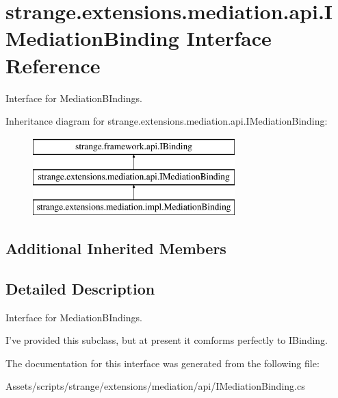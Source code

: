 \hypertarget{interfacestrange_1_1extensions_1_1mediation_1_1api_1_1_i_mediation_binding}{\section{strange.\-extensions.\-mediation.\-api.\-I\-Mediation\-Binding Interface Reference}
\label{interfacestrange_1_1extensions_1_1mediation_1_1api_1_1_i_mediation_binding}
}


Interface for Mediation\-B\-Indings.  


Inheritance diagram for strange.\-extensions.\-mediation.\-api.\-I\-Mediation\-Binding\-:\begin{figure}[H]
\begin{center}
\leavevmode
\includegraphics[height=3.000000cm]{interfacestrange_1_1extensions_1_1mediation_1_1api_1_1_i_mediation_binding}
\end{center}
\end{figure}
\subsection*{Additional Inherited Members}


\subsection{Detailed Description}
Interface for Mediation\-B\-Indings. 

I've provided this subclass, but at present it comforms perfectly to I\-Binding. 

The documentation for this interface was generated from the following file\-:\begin{DoxyCompactItemize}
\item 
Assets/scripts/strange/extensions/mediation/api/I\-Mediation\-Binding.\-cs\end{DoxyCompactItemize}
